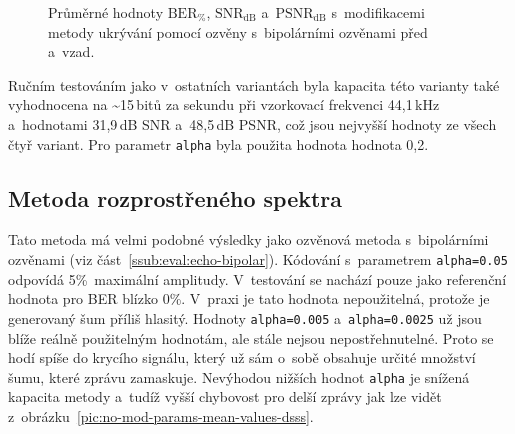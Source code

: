\begin{figure}[H]
    \table
    \centering
    \caption{Průměrné hodnoty $\mathrm{BER}_{\%}$, $\mathrm{SNR}_\mathrm{dB}$
    a~$\mathrm{PSNR}_\mathrm{dB}$ s~modifikacemi metody ukrývání pomocí
    ozvěny s~bipolárními ozvěnami před a~vzad.}
    \label{pic:modifications-mean-values-echo-bipolar-bf}
\end{figure}

Ručním testováním jako v~ostatních variantách byla kapacita této varianty také
vyhodnocena na \textasciitilde15\,bitů za sekundu při vzorkovací frekvenci
44,1\,kHz a~hodnotami 31,9\,dB SNR a~48,5\,dB PSNR, což jsou nejvyšší hodnoty
ze všech čtyř variant. Pro parametr \texttt{alpha} byla použita hodnota hodnota
0,2.

\subsection*{Metoda rozprostřeného spektra}

Tato metoda má velmi podobné výsledky jako ozvěnová metoda s~bipolárními
ozvěnami (viz část~\ref{ssub:eval:echo-bipolar}). Kódování s~parametrem
\texttt{alpha=0.05} odpovídá 5\%~maximální amplitudy. V~testování se nachází
pouze jako referenční hodnota pro BER blízko 0\%. V~praxi je tato hodnota
nepoužitelná, protože je generovaný šum příliš hlasitý. Hodnoty
\texttt{alpha=0.005} a~\texttt{alpha=0.0025} už jsou blíže reálně použitelným
hodnotám, ale stále nejsou nepostřehnutelné. Proto se hodí spíše do krycího
signálu, který už sám o~sobě obsahuje určité množství šumu, které zprávu
zamaskuje. Nevýhodou nižších hodnot \texttt{alpha} je snížená kapacita metody
a~tudíž vyšší chybovost pro delší zprávy jak lze vidět
z~obrázku~\ref{pic:no-mod-params-mean-values-dsss}.

